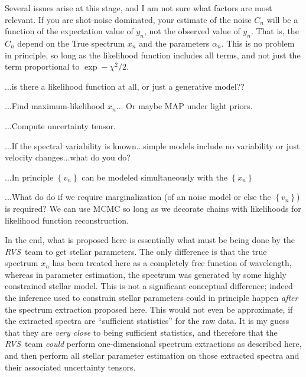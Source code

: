 \documentclass[11pt]{article}
\newcommand{\setof}[1]{\left\{{#1}\right\}}
\newcommand{\instrument}[1]{\textsl{#1}}
\newcommand{\RVS}{\instrument{RVS}}
\begin{document}
Several issues arise at this stage, and I am not sure what factors are
most relevant.
If you are shot-noise dominated, your estimate of the noise $C_n$ will
be a function of the expectation value of $y_n$, not the observed
value of $y_n$.
That is, the $C_n$ depend on the True spectrum $x_n$ and the
parameters $\alpha_n$.
This is no problem in principle, so long as the likelihood function
includes all terms, and not just the term proportional to $\exp
-\chi^2/2$.

...is there a likelihood function at all, or just a generative model??

...Find maximum-likelihood $x_n$... Or maybe MAP under light priors.

...Compute uncertainty tensor.

...If the spectral variability is known...simple models include no
variability or just velocity changes...what do you do?

...In principle $\setof{v_n}$ can be modeled simultaneously with the
$\setof{x_n}$

...What do do if we require marginalization (of an noise model or else
the $\setof{v_n}$) is required?  We can use MCMC so long as we
decorate chains with likelihoods for likelihood function
reconstruction.

In the end, what is proposed here is essentially what must be being
done by the \RVS\ team to get stellar parameters.
The only difference is that the true spectrum $x_n$ has been treated
here as a completely free function of wavelength, whereas in parameter
estimation, the spectrum was generated by some highly constrained
stellar model.
This is not a significant conceptual difference; indeed the inference
used to constrain stellar parameters could in principle happen
\emph{after} the spectrum extraction proposed here.
This would not even be approximate, if the extracted spectra are
``sufficient statistics'' for the raw data.
It is my guess that they are \emph{very close} to being sufficient
statistics, and therefore that the \RVS\ team \emph{could} perform
one-dimensional spectrum extractions as described here, and then
perform all stellar parameter estimation on those extracted spectra
and their associated uncertainty tensors.
\end{document}
